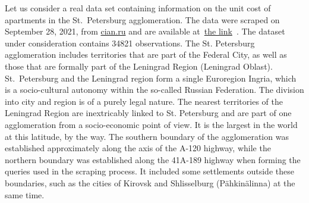 \documentclass[]{scrreprt}
\begin{document}
Let us consider a real data set containing information on the unit cost of apartments in the St.~Petersburg agglomeration. The data were scraped on September 28, 2021, from \href{https://www.cian.ru/}{cian.ru} and are available at~\href{https://github.com/Kirill-Murashev/datasets/blob/main/Saint-Petersburg/flats/spba_flats_210928.csv}{the link}~\cite{ds:spba-flats-210928}. The dataset under consideration contains 34821 observations. The St. Petersburg agglomeration includes territories that are part of the Federal City, as well as those that are formally part of the Leningrad Region (Leningrad Oblast). St.~Petersburg and the Leningrad region form a single Euroregion Ingria, which is a socio-cultural autonomy within the so-called Russian Federation. The division into city and region is of a purely legal nature. The nearest territories of the Leningrad Region are inextricably linked to St. Petersburg and are part of one agglomeration from a socio-economic point of view. It is the largest in the world at this latitude, by the way. The southern boundary of the agglomeration was established approximately along the axis of the A-120 highway, while the northern boundary was established along the 41A-189 highway when forming the queries used in the scraping process. It included some settlements outside these boundaries, such as the cities of Kirovsk and Shlisselburg (P\"{a}hkin\"{a}linna) at the same time.
\end{document}

